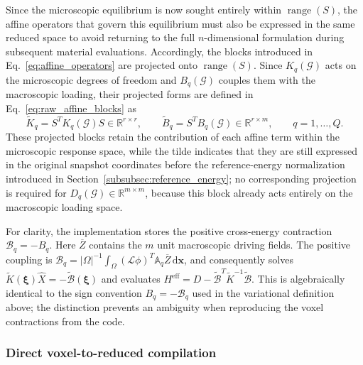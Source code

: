\documentclass[pdflatex,sn-basic,Numbered]{sn-jnl}
\newcommand{\R}{\mathbb{R}}
\newcommand{\G}{\mathcal{G}}
\begin{document}
Since the microscopic equilibrium is now sought entirely within
\(\operatorname{range}(S)\), the affine operators that govern this equilibrium
must also be expressed in the same reduced space to avoid returning to the
full \(n\)-dimensional formulation during subsequent material evaluations.
Accordingly, the blocks introduced in Eq.~\eqref{eq:affine_operators} are
projected onto \(\operatorname{range}(S)\). Since \(K_q(\G)\) acts on the
microscopic degrees of freedom and \(B_q(\G)\) couples them with the
macroscopic loading, their projected forms are defined in
Eq.~\eqref{eq:raw_affine_blocks} as
\begin{equation}
\label{eq:raw_affine_blocks}
\widetilde K_q
=
S^T K_q(\G)S
\in\R^{r\times r},
\qquad
\widetilde B_q
=
S^T B_q(\G)
\in\R^{r\times m},
\qquad
q=1,\ldots,Q.
\end{equation}
These projected blocks retain the contribution of each affine term within the
microscopic response space, while the tilde indicates that they are still
expressed in the original snapshot coordinates before the reference-energy
normalization introduced in
Section~\ref{subsubsec:reference_energy}; no corresponding projection is
required for \(D_q(\G)\in\R^{m\times m}\), because this block already acts
entirely on the macroscopic loading space.

For clarity, the implementation stores the positive cross-energy contraction
\(\mathcal B_q=-B_q\).
Here \(\overline Z\) contains the \(m\) unit macroscopic driving fields.
The positive coupling is \(\mathcal B_q=|\Omega|^{-1}\int_{\Omega}
(\mathcal L\phi)^T\mathbb A_q\overline Z\,\mathrm d\boldsymbol x\),
and consequently solves
\(\widetilde K(\boldsymbol\xi)\widehat X
=-\widetilde{\mathcal B}(\boldsymbol\xi)\) and evaluates
\(H^{\mathrm{eff}}=D-\widetilde{\mathcal B}^{T}
\widetilde K^{-1}\widetilde{\mathcal B}\). This is algebraically identical
to the sign convention \(B_q=-\mathcal B_q\) used in the variational
definition above; the distinction prevents an ambiguity when reproducing the
voxel contractions from the code.

\subsubsection{Direct voxel-to-reduced compilation}
\label{subsubsec:direct_voxel_compilation}
\end{document}
